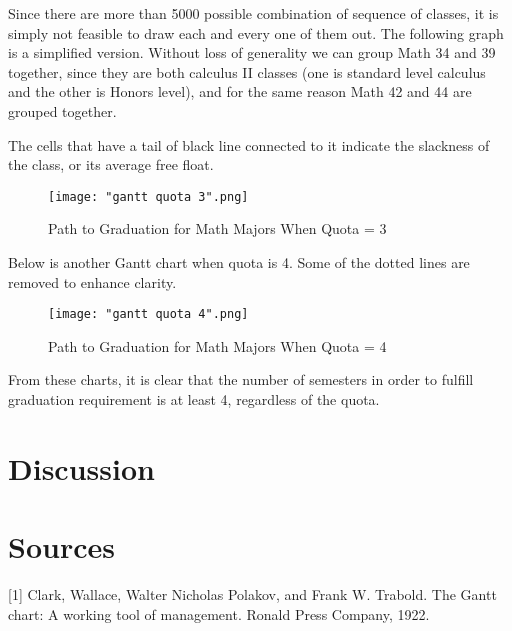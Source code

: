 \documentclass[11pt, oneside]{article}
\begin{document}
Since there are more than 5000 possible combination of sequence of classes, it is simply not feasible to draw each and every one of them out. The following graph is a simplified version. Without loss of generality we can group Math 34 and 39 together, since they are both calculus II classes (one is standard level calculus and the other is Honors level), and for the same reason Math 42 and 44 are grouped together.

The cells that have a tail of black line connected to it indicate the slackness of the class, or its average free float.  
\begin{figure}[!htb]
\caption{Path to Graduation for Math Majors When Quota = 3}
\texttt{[image: "gantt quota 3".png]}
\end{figure}

Below is another Gantt chart when quota is 4. Some of the dotted lines are removed to enhance clarity.
\begin{figure}[!htb]
\caption{Path to Graduation for Math Majors When Quota = 4}
\texttt{[image: "gantt quota 4".png]}
\end{figure}
From these charts, it is clear that the number of semesters in order to fulfill graduation requirement is at least 4, regardless of the quota.


\section{Discussion}
\section{Sources}
[1] Clark, Wallace, Walter Nicholas Polakov, and Frank W. Trabold. The Gantt chart: A working tool of management. Ronald Press Company, 1922.
\end{document}
